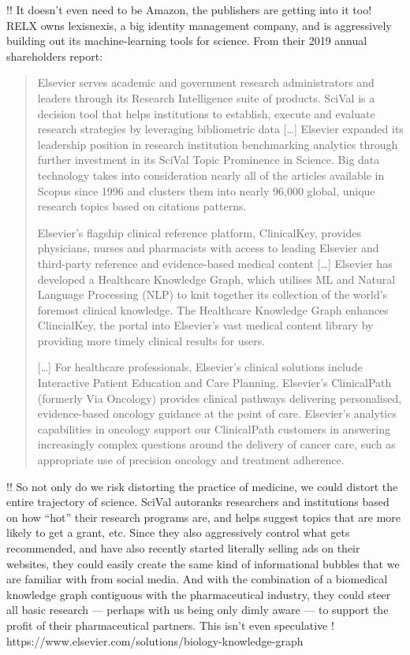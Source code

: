 \documentclass[10pt]{tufte-book}
\begin{document}
!! It doesn't even need to be Amazon, the publishers are getting into it
too! RELX owns lexisnexis, a big identity management company, and is
aggressively building out its machine-learning tools for science. From
their 2019 annual shareholders report:

\begin{quote}
Elsevier serves academic and government research administrators and
leaders through its Research Intelligence suite of products. SciVal is a
decision tool that helps institutions to establish, execute and evaluate
research strategies by leveraging bibliometric data {[}\ldots{]}
Elsevier expanded its leadership position in research institution
benchmarking analytics through further investment in its SciVal Topic
Prominence in Science. Big data technology takes into consideration
nearly all of the articles available in Scopus since 1996 and clusters
them into nearly 96,000 global, unique research topics based on
citations patterns.

Elsevier's flagship clinical reference platform, ClinicalKey, provides
physicians, nurses and pharmacists with access to leading Elsevier and
third-party reference and evidence-based medical content {[}\ldots{]}
Elsevier has developed a Healthcare Knowledge Graph, which utilises ML
and Natural Language Processing (NLP) to knit together its collection of
the world's foremost clinical knowledge. The Healthcare Knowledge Graph
enhances ClincialKey, the portal into Elsevier's vast medical content
library by providing more timely clinical results for users.

{[}\ldots{]} For healthcare professionals, Elsevier's clinical solutions
include Interactive Patient Education and Care Planning. Elsevier's
ClinicalPath (formerly Via Oncology) provides clinical pathways
delivering personalised, evidence-based oncology guidance at the point
of care. Elsevier's analytics capabilities in oncology support our
ClinicalPath customers in answering increasingly complex questions
around the delivery of cancer care, such as appropriate use of precision
oncology and treatment adherence.
\end{quote}

!! So not only do we risk distorting the practice of medicine, we could
distort the entire trajectory of science. SciVal autoranks researchers
and institutions based on how ``hot'' their research programs are, and
helps suggest topics that are more likely to get a grant, etc. Since
they also aggressively control what gets recommended, and have also
recently started literally selling ads on their websites, they could
easily create the same kind of informational bubbles that we are
familiar with from social media. And with the combination of a
biomedical knowledge graph contiguous with the pharmaceutical industry,
they could steer all basic research --- perhaps with us being only dimly
aware --- to support the profit of their pharmaceutical partners. This
isn't even speculative !
https://www.elsevier.com/solutions/biology-knowledge-graph
\end{document}
